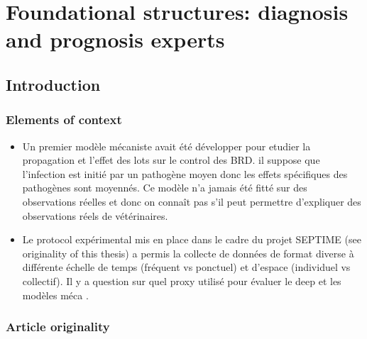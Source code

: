 
\chapter{Foundational structures: diagnosis and prognosis experts} %




\section{Introduction}
\subsection{Elements of context}

\begin{itemize}
    \item Un premier modèle mécaniste avait été développer pour etudier la propagation et l'effet des lots sur le control des BRD. il suppose que l'infection est initié par un pathogène moyen donc les effets spécifiques des pathogènes sont moyennés. Ce modèle n'a jamais été fitté sur des observations réelles et donc on connaît pas s'il peut permettre d'expliquer des observations réels de vétérinaires. 
    \item Le protocol expérimental mis en place dans le cadre du projet SEPTIME (see originality of this thesis) a permis la collecte de données de format diverse à différente échelle de temps (fréquent vs ponctuel) et d'espace (individuel vs collectif). Il y a question sur quel proxy utilisé pour évaluer le deep et les modèles méca .
\end{itemize}


\subsection{Article originality}

